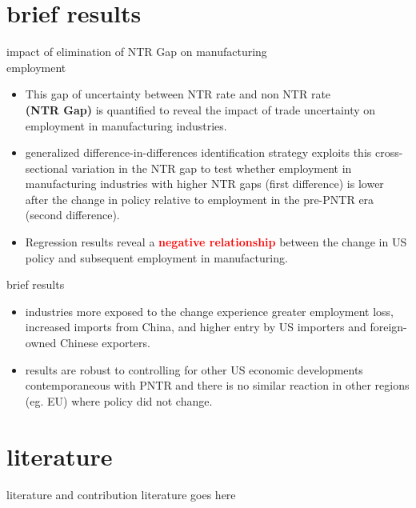 \documentclass[10pt]{beamer}
\begin{document}
\section{brief results}

\begin{frame}{impact of elimination of NTR Gap on manufacturing\\ employment}
	\begin{itemize}
		\item This gap of uncertainty between NTR rate and non NTR rate\\ \textbf{(NTR Gap)} is quantified to reveal the impact of trade uncertainty on employment in manufacturing industries.
		\item generalized difference-in-differences identification strategy exploits this cross-sectional variation in the NTR gap to test whether employment in manufacturing industries with higher NTR gaps (first difference) is lower after the change in policy relative to employment in the pre-PNTR era (second difference).
		\item Regression results reveal a \textbf{\textcolor{red}{negative relationship}} between the change in US policy and subsequent employment in manufacturing.
	\end{itemize}
\end{frame}


\begin{frame}{brief results}
	\begin{itemize}
		\item industries more exposed to the change experience greater employment loss, increased imports from China, and higher entry by US importers and foreign-owned Chinese exporters.
		\item results are robust to controlling for other US economic developments contemporaneous with PNTR and there is no similar reaction in other regions (eg. EU) where policy did not change.
	\end{itemize}

\end{frame}

\section{literature}

\begin{frame}[fragile]{literature and contribution}
	literature goes here
\end{frame}
\end{document}
